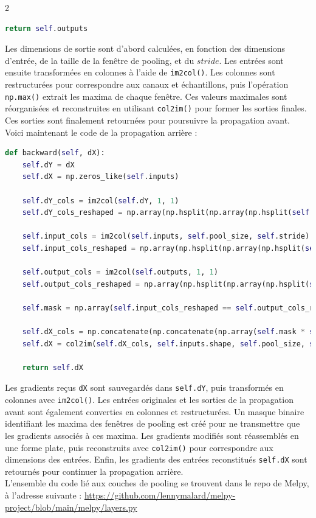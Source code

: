 \begin{multicols}{2}
\begin{lstlisting}[language=Python]
    return self.outputs
\end{lstlisting}
\hfill\break

Les dimensions de sortie sont d’abord calculées, en fonction des dimensions d’entrée, 
de la taille de la fenêtre de pooling, et du $stride$. Les entrées sont ensuite 
transformées en colonnes à l’aide de \texttt{im2col()}. Les colonnes sont restructurées pour 
correspondre aux canaux et échantillons, puis l’opération \texttt{np.max()}
extrait les maxima de chaque fenêtre. Ces valeurs maximales sont réorganisées et 
reconstruites en utilisant \texttt{col2im()} pour former les sorties finales.
Ces sorties sont finalement retournées pour poursuivre la propagation avant.\\

Voici maintenant le code de la propagation arrière : \\

\begin{lstlisting}[language=Python]
def backward(self, dX):
    self.dY = dX
    self.dX = np.zeros_like(self.inputs)

    self.dY_cols = im2col(self.dY, 1, 1)
    self.dY_cols_reshaped = np.array(np.hsplit(np.array(np.hsplit(self.dY_cols, self.dY.shape[0])), self.dY.shape[1])).transpose(0, 1, 3, 2)

    self.input_cols = im2col(self.inputs, self.pool_size, self.stride)
    self.input_cols_reshaped = np.array(np.hsplit(np.array(np.hsplit(self.input_cols, self.inputs.shape[0])), self.inputs.shape[1])).transpose(0, 1, 3, 2)

    self.output_cols = im2col(self.outputs, 1, 1)
    self.output_cols_reshaped = np.array(np.hsplit(np.array(np.hsplit(self.output_cols, self.inputs.shape[0])), self.inputs.shape[1])).transpose(0, 1, 3, 2)

    self.mask = np.array(self.input_cols_reshaped == self.output_cols_reshaped, dtype=np.uint64)

    self.dX_cols = np.concatenate(np.concatenate(np.array(self.mask * self.dY_cols_reshaped).transpose(0, 1, 3, 2), axis=1), axis=1)
    self.dX = col2im(self.dX_cols, self.inputs.shape, self.pool_size, self.stride)

    return self.dX
\end{lstlisting}
\hfill\break

Les gradients reçus \texttt{dX} sont sauvegardés dans \texttt{self.dY}, puis 
transformés en colonnes avec \texttt{im2col()}. Les entrées 
originales et les sorties de la propagation avant sont également converties en colonnes et 
restructurées. Un masque binaire identifiant les maxima des fenêtres de pooling est créé 
pour ne transmettre que les gradients associés à ces maxima. Les gradients modifiés sont 
réassemblés en une forme plate, puis reconstruits avec \texttt{col2im()} pour correspondre 
aux dimensions des entrées. Enfin, les gradients des entrées reconstitués \texttt{self.dX}
sont retournés pour continuer la propagation arrière. \\

L'ensemble du code lié aux couches de pooling se trouvent dans le repo de Melpy, à l'adresse suivante : \url{https://github.com/lennymalard/melpy-project/blob/main/melpy/layers.py}

\end{multicols}


